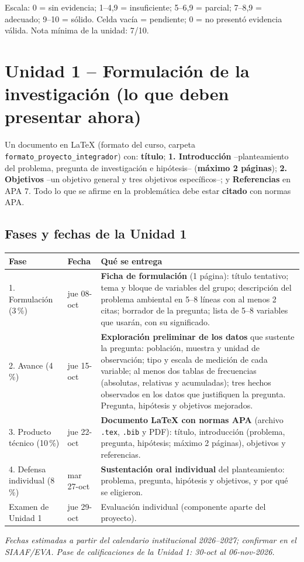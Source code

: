 \documentclass[11pt,a4paper]{article}
\begin{document}
Escala: 0 = sin evidencia; 1--4,9 = insuficiente; 5--6,9 = parcial; 7--8,9 = adecuado; 9--10 = sólido. Celda vacía = pendiente; 0 = no presentó evidencia válida. Nota mínima de la unidad: 7/10.

\section{Unidad 1 -- Formulación de la investigación (lo que deben presentar ahora)}

\begin{ahora}[title=Producto de la Unidad 1]
Un documento en \LaTeX{} (formato del curso, carpeta \nolinkurl{formato_proyecto_integrador}) con:
\textbf{título}; \textbf{1. Introducción} --planteamiento del problema, pregunta de investigación e hipótesis-- (\textbf{máximo 2 páginas}); \textbf{2. Objetivos} --un objetivo general y tres objetivos específicos--; y \textbf{Referencias} en APA 7. Todo lo que se afirme en la problemática debe estar \textbf{citado} con normas APA.
\end{ahora}

\subsection{Fases y fechas de la Unidad 1}

\begin{center}
\small
\renewcommand{\arraystretch}{1.25}
\begin{tabularx}{\textwidth}{L{2.9cm}C{1.7cm}Y}
\toprule
\textbf{Fase} & \textbf{Fecha} & \textbf{Qué se entrega} \\
. Formulación (3\,\%) & jue 08-oct & \textbf{Ficha de formulación} (1 página): título tentativo; tema y bloque de variables del grupo; descripción del problema ambiental en 5--8 líneas con al menos 2 citas; borrador de la pregunta; lista de 5--8 variables que usarán, con su significado. \\
2. Avance (4\,\%) & jue 15-oct & \textbf{Exploración preliminar de los datos} que sustente la pregunta: población, muestra y unidad de observación; tipo y escala de medición de cada variable; al menos dos tablas de frecuencias (absolutas, relativas y acumuladas); tres hechos observados en los datos que justifiquen la pregunta. Pregunta, hipótesis y objetivos mejorados. \\
3. Producto técnico (10\,\%) & jue 22-oct & \textbf{Documento \LaTeX{} con normas APA} (archivo \texttt{.tex}, \texttt{.bib} y PDF): título, introducción (problema, pregunta, hipótesis; máximo 2 páginas), objetivos y referencias. \\
4. Defensa individual (8\,\%) & mar 27-oct & \textbf{Sustentación oral individual} del planteamiento: problema, pregunta, hipótesis y objetivos, y por qué se eligieron. \\
Examen de Unidad 1 & jue 29-oct & Evaluación individual (componente aparte del proyecto). \\
\bottomrule
\end{tabularx}
\end{center}
{\footnotesize\textit{Fechas estimadas a partir del calendario institucional 2026--2027; confirmar en el SIAAF/EVA. Pase de calificaciones de la Unidad 1: 30-oct al 06-nov-2026.}}
\end{document}

